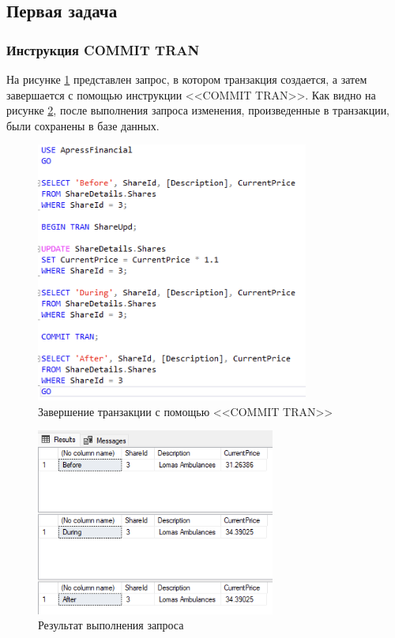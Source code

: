 \documentclass[a4paper, 14pt]{extarticle}
\begin{document}
\subsection{Первая задача}

\subsubsection{Инструкция COMMIT TRAN}

На рисунке \ref{fig:task-1-1} представлен запрос, в котором транзакция
создается, а затем завершается с помощью инструкции
<<\foreignlanguage{english}{COMMIT TRAN}>>. Как видно на рисунке
\ref{fig:task-1-2}, после выполнения запроса изменения, произведенные в
транзакции, были сохранены в базе данных.

\begin{figure}[H]
  \centering
  \includegraphics[width=0.8\textwidth]{images/task-1/1.png}
  \caption{
    Завершение транзакции с помощью <<\foreignlanguage{english}{COMMIT TRAN}>>
  }
  \label{fig:task-1-1}
\end{figure}

\begin{figure}[H]
  \centering
  \includegraphics[width=0.7\textwidth]{images/task-1/2.png}
  \caption{Результат выполнения запроса}
  \label{fig:task-1-2}
\end{figure}
\end{document}
